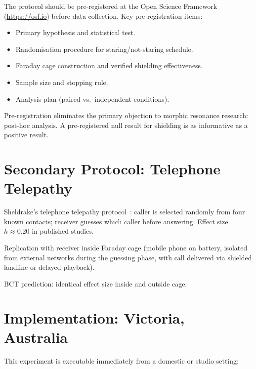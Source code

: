 \documentclass[aps,prl,twocolumn,superscriptaddress,floatfix]{revtex4-2}
\begin{document}
The protocol should be pre-registered at the Open Science Framework
(\url{https://osf.io}) before data collection. Key pre-registration
items:
\begin{itemize}
\item Primary hypothesis and statistical test.
\item Randomisation procedure for staring/not-staring schedule.
\item Faraday cage construction and verified shielding effectiveness.
\item Sample size and stopping rule.
\item Analysis plan (paired vs.\ independent conditions).
\end{itemize}

Pre-registration eliminates the primary objection to morphic resonance
research: post-hoc analysis. A pre-registered null result for shielding
is as informative as a positive result.

\section{Secondary Protocol: Telephone Telepathy}

Sheldrake's telephone telepathy protocol~\cite{Sheldrake2003}:
caller is selected randomly from four known contacts; receiver
guesses which caller before answering. Effect size $h \approx 0.20$
in published studies.

Replication with receiver inside Faraday cage (mobile phone on
battery, isolated from external networks during the guessing phase,
with call delivered via shielded landline or delayed playback).

BCT prediction: identical effect size inside and outside cage.

\section{Implementation: Victoria, Australia}

This experiment is executable immediately from a domestic or
studio setting:
\end{document}
